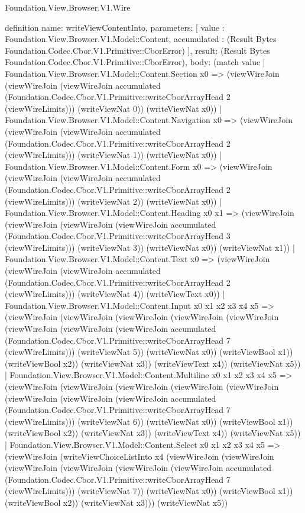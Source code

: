 \begin{lexlean}{Foundation.View.Browser.V1.Wire}
\begin{semanticmodule}
definition{
  name: writeViewContentInto,
  parameters: [
    value : Foundation.View.Browser.V1.Model::Content,
    accumulated : (Result Bytes Foundation.Codec.Cbor.V1.Primitive::CborError)
  ],
  result: (Result Bytes Foundation.Codec.Cbor.V1.Primitive::CborError),
  body: (match value
    | Foundation.View.Browser.V1.Model::Content.Section x0 => (viewWireJoin (viewWireJoin (viewWireJoin accumulated (Foundation.Codec.Cbor.V1.Primitive::writeCborArrayHead 2 (viewWireLimits))) (writeViewNat 0)) (writeViewNat x0))
    | Foundation.View.Browser.V1.Model::Content.Navigation x0 => (viewWireJoin (viewWireJoin (viewWireJoin accumulated (Foundation.Codec.Cbor.V1.Primitive::writeCborArrayHead 2 (viewWireLimits))) (writeViewNat 1)) (writeViewNat x0))
    | Foundation.View.Browser.V1.Model::Content.Form x0 => (viewWireJoin (viewWireJoin (viewWireJoin accumulated (Foundation.Codec.Cbor.V1.Primitive::writeCborArrayHead 2 (viewWireLimits))) (writeViewNat 2)) (writeViewNat x0))
    | Foundation.View.Browser.V1.Model::Content.Heading x0 x1 => (viewWireJoin (viewWireJoin (viewWireJoin (viewWireJoin accumulated (Foundation.Codec.Cbor.V1.Primitive::writeCborArrayHead 3 (viewWireLimits))) (writeViewNat 3)) (writeViewNat x0)) (writeViewNat x1))
    | Foundation.View.Browser.V1.Model::Content.Text x0 => (viewWireJoin (viewWireJoin (viewWireJoin accumulated (Foundation.Codec.Cbor.V1.Primitive::writeCborArrayHead 2 (viewWireLimits))) (writeViewNat 4)) (writeViewText x0))
    | Foundation.View.Browser.V1.Model::Content.Input x0 x1 x2 x3 x4 x5 => (viewWireJoin (viewWireJoin (viewWireJoin (viewWireJoin (viewWireJoin (viewWireJoin (viewWireJoin (viewWireJoin accumulated (Foundation.Codec.Cbor.V1.Primitive::writeCborArrayHead 7 (viewWireLimits))) (writeViewNat 5)) (writeViewNat x0)) (writeViewBool x1)) (writeViewBool x2)) (writeViewNat x3)) (writeViewText x4)) (writeViewNat x5))
    | Foundation.View.Browser.V1.Model::Content.Multiline x0 x1 x2 x3 x4 x5 => (viewWireJoin (viewWireJoin (viewWireJoin (viewWireJoin (viewWireJoin (viewWireJoin (viewWireJoin (viewWireJoin accumulated (Foundation.Codec.Cbor.V1.Primitive::writeCborArrayHead 7 (viewWireLimits))) (writeViewNat 6)) (writeViewNat x0)) (writeViewBool x1)) (writeViewBool x2)) (writeViewNat x3)) (writeViewText x4)) (writeViewNat x5))
    | Foundation.View.Browser.V1.Model::Content.Select x0 x1 x2 x3 x4 x5 => (viewWireJoin (writeViewChoiceListInto x4 (viewWireJoin (viewWireJoin (viewWireJoin (viewWireJoin (viewWireJoin (viewWireJoin accumulated (Foundation.Codec.Cbor.V1.Primitive::writeCborArrayHead 7 (viewWireLimits))) (writeViewNat 7)) (writeViewNat x0)) (writeViewBool x1)) (writeViewBool x2)) (writeViewNat x3))) (writeViewNat x5))
}
\end{semanticmodule}
\end{lexlean}
